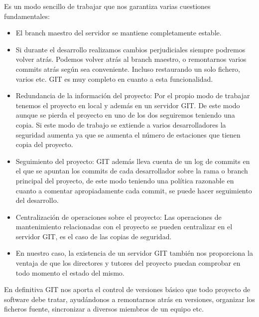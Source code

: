 Es un modo sencillo de trabajar que nos garantiza varias cuestiones fundamentales:

\begin{itemize}

\item El branch maestro del servidor se mantiene completamente estable.

\item Si durante el desarrollo realizamos cambios perjudiciales siempre podremos volver atrás. Podemos volver atrás al branch maestro, o remontarnos varios commits atrás según sea conveniente. Incluso restaurando un solo fichero, varios etc. GIT es muy completo en cuanto a esta funcionalidad.

\item Redundancia de la información del proyecto: Por el propio modo de trabajar tenemos el proyecto en local y además en un servidor GIT. De este modo aunque se pierda el proyecto en uno de los dos seguiremos teniendo una copia. Si este modo de trabajo se extiende a varios desarrolladores la seguridad aumenta ya que se aumenta el número de estaciones que tienen copia del proyecto.

\item Seguimiento del proyecto: GIT además lleva cuenta de un log de commits en el que se apuntan los commits de cada desarrollador sobre la rama o branch principal del proyecto, de este modo teniendo una política razonable en cuanto a comentar apropiadamente cada commit, se puede hacer seguimiento del desarrollo.

\item Centralización de operaciones sobre el proyecto: Las operaciones de mantenimiento relacionadas con el proyecto se pueden centralizar en el servidor GIT, es el caso de las copias de seguridad.

\item En nuestro caso, la existencia de un servidor GIT también nos proporciona la ventaja de que los directores y tutores del proyecto puedan comprobar en todo momento el estado del mismo.

\end{itemize}


En definitiva GIT nos aporta el control de versiones básico que todo proyecto de software debe tratar, ayudándonos a remontarnos atrás en versiones, organizar los ficheros fuente, sincronizar a diversos miembros de un equipo etc.



